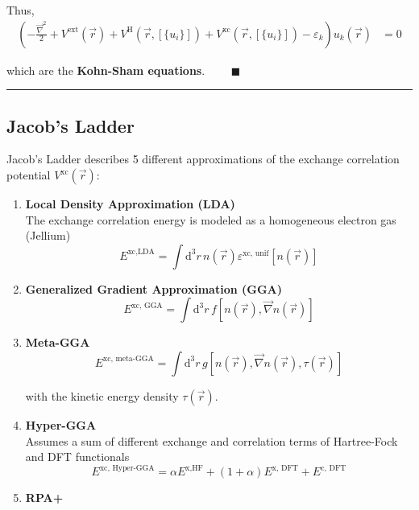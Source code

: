 \documentclass{article}
\newcommand{\diff}{\mathrm{d}}
\newcommand{\lr}[1]{\left(#1\right)}
\begin{document}
{	Thus,
		\begin{align*}
			\lr{ -\frac{\vec{\nabla}^2}{2} + V^\text{ext}(\vec{r}) + V^\text{H}(\vec{r},[\{u_i\}]) + V^\text{xc}(\vec{r},[\{u_i\}]) - \varepsilon_k } u_k(\vec{r}) &= 0
		\end{align*}
	
	which are the \textbf{Kohn-Sham equations}. $\qquad \blacksquare$

\hrule
}


\newpage


\subsection{Jacob's Ladder}
Jacob's Ladder describes 5 different approximations of the exchange correlation potential $V^\text{xc}(\vec{r})$:
	\begin{enumerate}
		\item \textbf{Local Density Approximation (LDA)}\\
		The exchange correlation energy is modeled as a homogeneous electron gas (Jellium)
			\begin{equation}
				E^\text{xc,LDA} = \int \diff^3r \, n(\vec{r}) \varepsilon^\text{xc, unif}[n(\vec{r})]
			\end{equation}
		
		
		\item \textbf{Generalized Gradient Approximation (GGA)}
			\begin{equation}
				E^\text{xc, GGA} = \int \diff^3r \, f[n(\vec{r}), \vec{\nabla}n(\vec{r})]
			\end{equation}
		
		
		\item \textbf{Meta-GGA}
			\begin{equation}
				E^\text{xc, meta-GGA} = \int \diff^3r \, g[n(\vec{r}), \vec{\nabla}n(\vec{r}), \tau(\vec{r})]
			\end{equation}
		
		with the kinetic energy density $\tau(\vec{r})$.


		\item \textbf{Hyper-GGA}\\
		Assumes a sum of different exchange and correlation terms of Hartree-Fock and DFT functionals
			\begin{equation}
				E^\text{xc, Hyper-GGA} = \alpha E^\text{x,HF} + (1+\alpha) E^\text{x, DFT} + E^\text{c, DFT}
			\end{equation}
		
		\item \textbf{RPA+}\\
		\textcolor{red}{}
	\end{enumerate}
\end{document}
